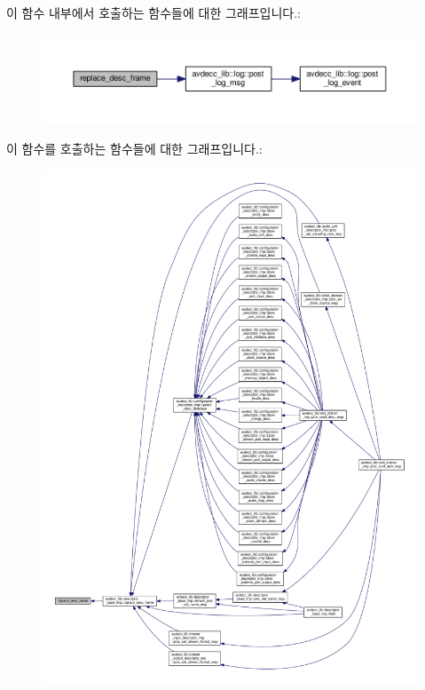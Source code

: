 이 함수 내부에서 호출하는 함수들에 대한 그래프입니다.\+:
\nopagebreak
\begin{figure}[H]
\begin{center}
\leavevmode
\includegraphics[width=350pt]{classavdecc__lib_1_1response__frame_a438c7ec184b6d10ffcd8bc97a4cfa773_cgraph}
\end{center}
\end{figure}




이 함수를 호출하는 함수들에 대한 그래프입니다.\+:
\nopagebreak
\begin{figure}[H]
\begin{center}
\leavevmode
\includegraphics[width=350pt]{classavdecc__lib_1_1response__frame_a438c7ec184b6d10ffcd8bc97a4cfa773_icgraph}
\end{center}
\end{figure}


